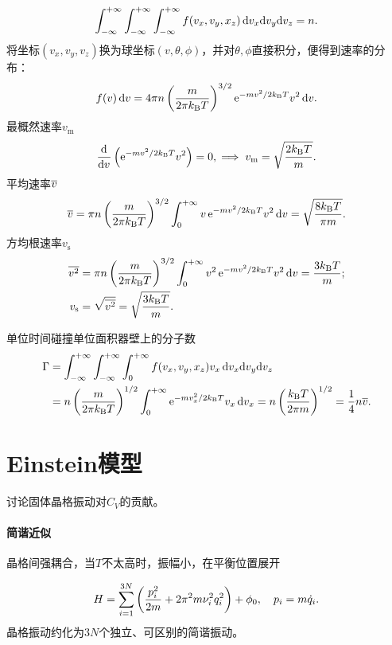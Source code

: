 \[
	\int_{-\infty}^{+\infty}\int_{-\infty}^{+\infty}\int_{-\infty}^{+\infty} f(v_x,v_y,x_z)\mathop{}\!\mathrm{d} v_x\mathrm{d} v_y\mathrm{d} v_z=n.
\]
将坐标$(v_x,v_y,v_z)$换为球坐标$(v,\theta,\phi)$，并对$\theta,\phi$直接积分，便得到速率的分布：
\begin{align}
	f(v)\mathop{}\!\mathrm{d} v=4\pi n\left(\frac m{2\pi k_{\mathrm B} T}\right)^{3/2}\mathop{}\!\mathrm{e}^{-mv^2/2k_{\mathrm B} T}v^2\mathop{}\!\mathrm{d} v.
\end{align}
最概然速率$v_\mathrm m$
\begin{gather}
	\frac{\mathrm{d}^{{}}}{\mathrm{d}{v}^{{}}}\left(\mathop{}\!\mathrm{e}^{-mv^2/2k_{\mathrm B} T}v^2\right)=0,\implies
	v_\mathrm m=\sqrt{\frac{2k_{\mathrm B} T}m}.
\end{gather}
平均速率$\overline{v}$
\begin{align}
	\overline{v}=\pi n\left(\frac m{2\pi k_{\mathrm B} T}\right)^{3/2}\int_0^{+\infty} v\mathop{}\!\mathrm{e}^{-mv^2/2k_{\mathrm B} T}v^2\mathop{}\!\mathrm{d} v=\sqrt{\frac{8k_{\mathrm B} T}{\pi m}}.
\end{align}
方均根速率$v_\mathrm s$
\begin{align}\notag
	\overline{v^2}&=\pi n\left(\frac m{2\pi k_{\mathrm B} T}\right)^{3/2}\int_0^{+\infty} v^2\mathop{}\!\mathrm{e}^{-mv^2/2k_{\mathrm B} T}v^2\mathop{}\!\mathrm{d} v=\frac{3k_{\mathrm B} T}m;\\
	v_\mathrm s&=\sqrt{\overline{v^2}}=\sqrt{\frac{3k_{\mathrm B} T}m}.
\end{align}

单位时间碰撞单位面积器壁上的分子数
\begin{align}\notag
	\Gamma&=\int_{-\infty}^{+\infty}\int_{-\infty}^{+\infty}\int_0^{+\infty} f(v_x,v_y,x_z) v_x\mathop{}\!\mathrm{d} v_x\mathrm{d} v_y\mathrm{d} v_z\\
	&=n\left(\frac m{2\pi k_{\mathrm B} T}\right)^{1/2}\int_0^{+\infty}\mathop{}\!\mathrm{e}^{-mv_x^2/2k_{\mathrm B} T}v_x\mathop{}\!\mathrm{d} v_x=n\left(\frac{k_{\mathrm B} T}{2\pi m}\right)^{1/2}=\frac14n\overline{v}.
\end{align}
\section{Einstein模型}
讨论固体晶格振动对$C_V$的贡献。
\paragraph{简谐近似}
晶格间强耦合，当$T$不太高时，振幅小，在平衡位置展开
\iffalse
	\[
	\varPhi(x_1,x_2,\ldots,x_{3N})=\edg\phi_{x_i=0}+\sum\edg{\pv\phi{x_i}}_{x_i=0}x_i+\frac12\sum\edg{\pw\phi{x_i}{x_j}}_{x_j=0}x_ix_j+\cdots
\]
	保留至二次项
	\[
	H=\sum\frac12\dot x_i^2+\sum\frac12C_{ij}x_ix_j+\phi_0,\quad C_{ij}:=\edg{\pw\phi{x_i}{x_j}}_{x_j=0}.
\]
	使用正交变换使其对角化
	\begin{align*}
		xCx\tp=q\Lambda q\tp.
	\end{align*}
\fi
\[
	H=\sum_{i=1}^{3N}\left(\frac{p_i^2}{2m}+2\pi^2m\nu_i^2q_i^2\right)+\phi_0,\quad p_i=m\dot q_i.
\]
晶格振动约化为$3N$个独立、可区别的简谐振动。
